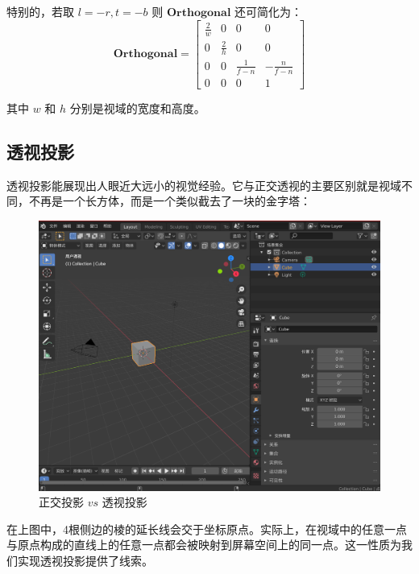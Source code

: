 \documentclass[12pt,oneside,a4paper]{ctexart}
\begin{document}
特别的，若取 $l=-r, t=-b$ 则 $\mathbf{Orthogonal}$ 还可简化为：
\begin{equation}
	\mathbf{Orthogonal}=
	\begin{bmatrix}
		\frac{2}{w} & 0           & 0             & 0              \\
		0           & \frac{2}{h} & 0             & 0              \\
		0           & 0           & \frac{1}{f-n} & -\frac{n}{f-n} \\
		0           & 0           & 0             & 1
	\end{bmatrix}
\end{equation}

其中 $w$ 和 $h$ 分别是视域的宽度和高度。
\subsection{透视投影}
透视投影能展现出人眼近大远小的视觉经验。它与正交透视的主要区别就是视域不同，不再是一个长方体，而是一个类似截去了一块的金字塔：
\begin{figure}[H]
	\centering
	\includegraphics[scale=0.4]{Picture/Annotation 2020-06-23 205119.png}
	\vspace{-2ex}
	\caption{正交投影 $vs$ 透视投影}
	\label{OrthViewCube}
\end{figure}

在上图中，4根侧边的棱的延长线会交于坐标原点。实际上，在视域中的任意一点与原点构成的直线上的任意一点都会被映射到屏幕空间上的同一点。这一性质为我们实现透视投影提供了线索。
\end{document}
